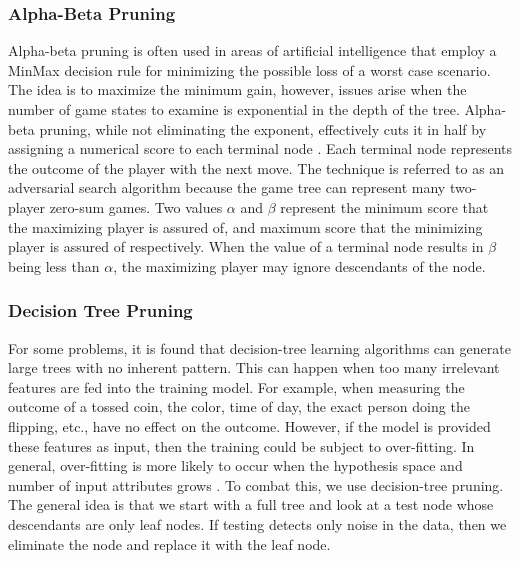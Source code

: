 	\subsubsection{Alpha-Beta Pruning}
		Alpha-beta pruning is often used in areas of artificial intelligence that employ a MinMax decision rule for minimizing the possible loss of a worst case scenario. 
		The idea is to maximize the minimum gain, however, issues arise when the number of game states to examine is exponential in the depth of the tree. 
		Alpha-beta pruning, while not eliminating the exponent, effectively cuts it in half by assigning a numerical score to each terminal node \cite{russell2010artificial}. 
		Each terminal node represents the outcome of the player with the next move.
		The technique is referred to as an adversarial search algorithm because the game tree can represent many two-player zero-sum games. 
		Two values $\alpha$ and $\beta$ represent the minimum score that the maximizing player is assured of, and maximum score that the minimizing player is assured of respectively. 
		When the value of a terminal node results in $\beta$ being less than $\alpha$, the maximizing player may ignore descendants of the node.  
	\subsubsection{Decision Tree Pruning}
		For some problems, it is found that decision-tree learning algorithms can generate large trees with no inherent pattern. This can happen when too many irrelevant features are fed into the training model. 
		For example, when measuring the outcome of a tossed coin, the color, time of day, the exact person doing the flipping, etc.,  have no effect on the outcome. 
		However, if the model is provided these features as input, then the training could be subject to over-fitting. 
		In general, over-fitting is more likely to occur when the hypothesis space and number of input attributes grows \cite{russell2010artificial}. 
		To combat this, we use decision-tree pruning. 
		The general idea is that we start with a full tree and look at a test node whose descendants are only leaf nodes. 
		If testing detects only noise in the data, then we eliminate the node and replace it with the leaf node.
	